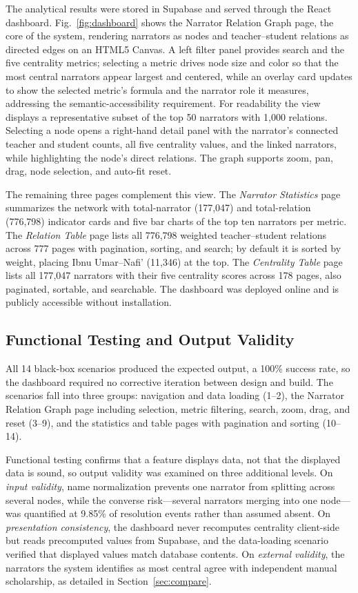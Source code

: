 \documentclass[conference]{IEEEtran}
\begin{document}
The analytical results were stored in Supabase and served through the React
dashboard. Fig.~\ref{fig:dashboard} shows the Narrator Relation Graph page, the
core of the system, rendering narrators as nodes and teacher--student relations as
directed edges on an HTML5 Canvas. A left filter panel provides search and the
five centrality metrics; selecting a metric drives node size and color so that
the most central narrators appear largest and centered, while an overlay card
updates to show the selected metric's formula and the narrator role it measures,
addressing the semantic-accessibility requirement. For readability the view
displays a representative subset of the top 50 narrators with 1{,}000 relations.
Selecting a node opens a right-hand detail panel with the narrator's connected
teacher and student counts, all five centrality values, and the linked narrators,
while highlighting the node's direct relations. The graph supports zoom, pan,
drag, node selection, and auto-fit reset.

The remaining three pages complement this view. The \emph{Narrator Statistics}
page summarizes the network with total-narrator (177{,}047) and total-relation
(776{,}798) indicator cards and five bar charts of the top ten narrators per
metric. The \emph{Relation Table} page lists all 776{,}798 weighted
teacher--student relations across 777 pages with pagination, sorting, and search;
by default it is sorted by weight, placing Ibnu Umar--Nafi' (11{,}346) at the top.
The \emph{Centrality Table} page lists all 177{,}047 narrators with their five
centrality scores across 178 pages, also paginated, sortable, and searchable. The
dashboard was deployed online and is publicly accessible without installation.

\subsection{Functional Testing and Output Validity}

All 14 black-box scenarios produced the expected output, a 100\% success rate, so
the dashboard required no corrective iteration between design and build. The
scenarios fall into three groups: navigation and data loading (1--2), the
Narrator Relation Graph page including selection, metric filtering, search, zoom,
drag, and reset (3--9), and the statistics and table pages with pagination and
sorting (10--14).

Functional testing confirms that a feature displays data, not that the displayed
data is sound, so output validity was examined on three additional levels. On
\emph{input validity}, name normalization prevents one narrator from splitting
across several nodes, while the converse risk---several narrators merging into one
node---was quantified at 9.85\% of resolution events rather than assumed absent.
On \emph{presentation consistency}, the dashboard never recomputes centrality
client-side but reads precomputed values from Supabase, and the data-loading
scenario verified that displayed values match database contents. On \emph{external
validity}, the narrators the system identifies as most central agree with
independent manual scholarship, as detailed in Section~\ref{sec:compare}.
\end{document}
